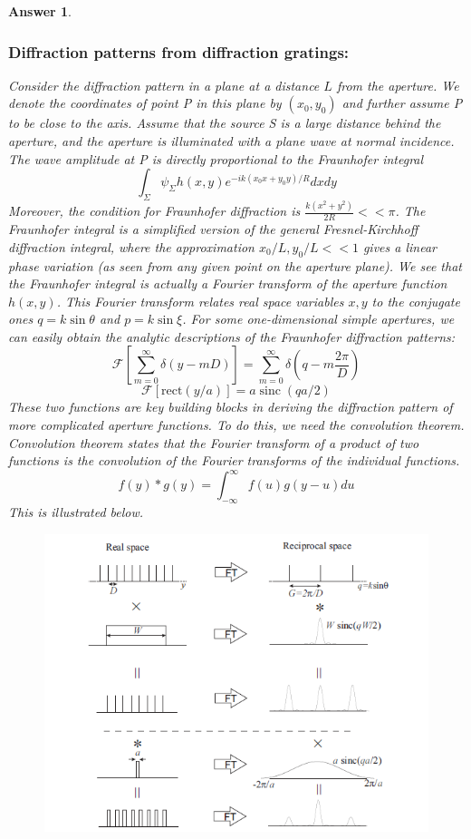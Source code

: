\documentclass[a4paper]{article}
\DeclareMathOperator{\sinc}{sinc}
\newtheorem{ans}{Answer}[subsection]
\theoremstyle{new}
\begin{document}
\begin{ans}
\subsubsection*{Diffraction patterns from diffraction gratings:}
Consider the diffraction pattern in a plane at a distance $L$ from the aperture. We denote the coordinates of point P in this plane by $(x_0,y_0)$ and further assume P to be close to the axis. Assume that the source S is a large distance behind the aperture, and the aperture is illuminated with a plane wave at normal incidence. The wave amplitude at P is directly proportional to the Fraunhofer integral
$$\int_\Sigma\psi_\Sigma h(x,y)e^{-ik(x_0x+y_0y)/R}dxdy$$
Moreover, the condition for Fraunhofer diffraction is $\frac{k(x^2+y^2)}{2R}<<\pi$. The Fraunhofer integral is a simplified version of the general Fresnel-Kirchhoff diffraction integral, where the approximation $x_0/L,y_0/L<<1$ gives a linear phase variation (as seen from any given point on the aperture plane). We see that the Fraunhofer integral is actually a Fourier transform of the aperture function $h(x,y)$. This Fourier transform relates real space variables $x,y$ to the conjugate ones $q=k\sin\theta$ and $p=k\sin\xi$. For some one-dimensional simple apertures, we can easily obtain the analytic descriptions of the Fraunhofer diffraction patterns:
$$\mathcal{F}[\sum_{m=0}^\infty\delta(y-mD)]=\sum_{m=0}^\infty\delta(q-m\frac{2\pi}{D})$$
$$\mathcal{F}[\text{rect}(y/a)]=a\sinc(qa/2)$$
These two functions are key building blocks in deriving the diffraction pattern of more complicated aperture functions. To do this, we need the convolution theorem. Convolution theorem states that the Fourier transform of a product of two functions is the convolution of the Fourier transforms of the individual functions.
$$f(y)*g(y)=\int_{-\infty}^\infty f(u)g(y-u)du$$
This is illustrated below.
\begin{figure}[H]
    \centering
    \includegraphics[scale=0.75]{convolution.PNG}

\end{figure}
\end{ans}
\end{document}
